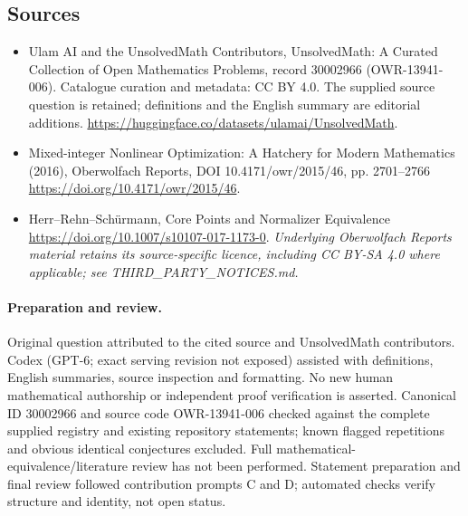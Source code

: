 \documentclass[11pt]{article}
\begin{document}
\subsection{Sources}
\begin{itemize}
\item[\hypertarget{source:30002966:1}{S1}] Ulam AI and the UnsolvedMath Contributors, UnsolvedMath: A Curated Collection of Open Mathematics Problems, record 30002966 (OWR-13941-006). Catalogue curation and metadata: CC BY 4.0. The supplied source question is retained; definitions and the English summary are editorial additions.
\url{https://huggingface.co/datasets/ulamai/UnsolvedMath}.
\item[\hypertarget{source:30002966:2}{S2}] Mixed-integer Nonlinear Optimization: A Hatchery for Modern Mathematics (2016), Oberwolfach Reports, DOI 10.4171/owr/2015/46, pp. 2701--2766
\url{https://doi.org/10.4171/owr/2015/46}.
\item[\hypertarget{source:30002966:3}{S3}] Herr--Rehn--Schürmann, Core Points and Normalizer Equivalence
\url{https://doi.org/10.1007/s10107-017-1173-0}.
\textit{Underlying Oberwolfach Reports material retains its source-specific licence, including CC BY-SA 4.0 where applicable; see THIRD\_PARTY\_NOTICES.md.}
\end{itemize}
\paragraph{Preparation and review.}
Original question attributed to the cited source and UnsolvedMath contributors. Codex (GPT-6; exact serving revision not exposed) assisted with definitions, English summaries, source inspection and formatting. No new human mathematical authorship or independent proof verification is asserted. Canonical ID 30002966 and source code OWR-13941-006 checked against the complete supplied registry and existing repository statements; known flagged repetitions and obvious identical conjectures excluded. Full mathematical-equivalence/literature review has not been performed. Statement preparation and final review followed contribution prompts C and D; automated checks verify structure and identity, not open status.
\label{end:30002966}
\end{document}
